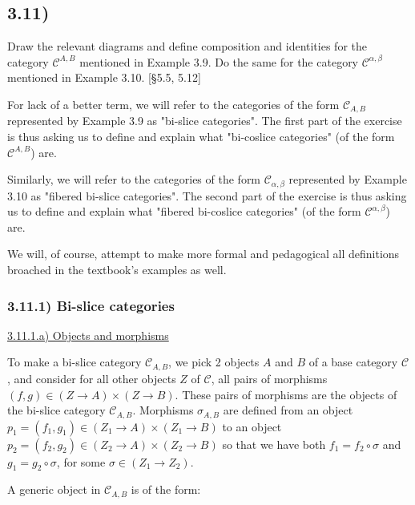 \subsection*{3.11)}

Draw the relevant diagrams and define composition and identities for the category $\mathcal{C}^{A,B}$ mentioned in Example 3.9. Do the same for the category $\mathcal{C}^{\alpha, \beta}$ mentioned in Example 3.10. [§5.5, 5.12]

For lack of a better term, we will refer to the categories of the form $\mathcal{C}_{A,B}$ represented by Example 3.9 as "bi-slice categories". The first part of the exercise is thus asking us to define and explain what "bi-coslice categories" (of the form $\mathcal{C}^{A,B}$) are.

Similarly, we will refer to the categories of the form $\mathcal{C}_{\alpha, \beta}$ represented by Example 3.10 as "fibered bi-slice categories". The second part of the exercise is thus asking us to define and explain what "fibered bi-coslice categories" (of the form $\mathcal{C}^{\alpha, \beta}$) are.

We will, of course, attempt to make more formal and pedagogical all definitions broached in the textbook's examples as well.


\subsubsection*{3.11.1) Bi-slice categories}

\vspace{5mm}
\underline{3.11.1.a) Objects and morphisms}

To make a bi-slice category $\mathcal{C}_{A,B}$, we pick 2 objects $A$ and $B$ of a base category $\mathcal{C}$, and consider for all other objects $Z$ of $\mathcal{C}$, all pairs of morphisms $(f, g) \in (Z \to A) \times (Z \to B)$. These pairs of morphisms are the objects of the bi-slice category $\mathcal{C}_{A,B}$. Morphisms $\sigma_{A,B}$ are defined from an object $p_1 = (f_1, g_1) \in (Z_1 \to A) \times (Z_1 \to B)$ to an object $p_2 = (f_2, g_2) \in (Z_2 \to A) \times (Z_2 \to B)$ so that we have both $f_1 = f_2 \circ \sigma$ and $g_1 = g_2 \circ \sigma$, for some $\sigma \in (Z_1 \to Z_2)$.

A generic object in $\mathcal{C}_{A,B}$ is of the form:



